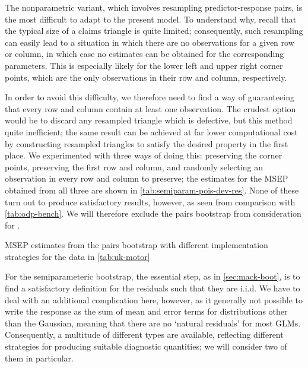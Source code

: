 \documentclass[a4paper]{book}
\begin{document}
The nonparametric variant, which involves resampling predictor-response pairs, is the most difficult to adapt to the present model. To understand why, recall that the typical size of a claims triangle is quite limited; consequently, such resampling can easily lead to a situation in which there are no observations for a given row or column, in which case no estimates can be obtained for the corresponding parameters. This is especially likely for the lower left and upper right corner points, which are the only observations in their row and column, respectively.

In order to avoid this difficulty, we therefore need to find a way of guaranteeing that every row and column contain at least one observation. The crudest option would be to discard any resampled triangle which is defective, but this method quite inefficient; the same result can be achieved at far lower computational cost by constructing resampled triangles to satisfy the desired property in the first place. We experimented with three ways of doing this: preserving the corner points, preserving the first row and column, and randomly selecting an observation in every row and column to preserve; the estimates for the MSEP obtained from all three are shown in \cref{tab:semiparam-pois-dev-res}. None of these turn out to produce satisfactory results, however, as seen from comparison with \cref{tab:odp-bench}. We will therefore exclude the pairs bootstrap from consideration for .

\begin{table}
  \centering
  
  \caption{MSEP estimates from the pairs bootstrap with different implementation strategies for the data in \cref{tab:uk-motor}}
  \label{tab:semiparam-pois-dev-res}
\end{table}

For the semiparameteric bootstrap, the essential step, as in \cref{sec:mack-boot}, is to find a satisfactory definition for the residuals such that they are i.i.d. We have to deal with an additional complication here, however, as it generally not possible to write the response as the sum of mean and error terms for distributions other than the Gaussian, meaning that there are no `natural residuals' for most GLMs. Consequently, a multitude of different types are available, reflecting different strategies for producing suitable diagnostic quantities; we will consider two of them in particular. 
\end{document}
